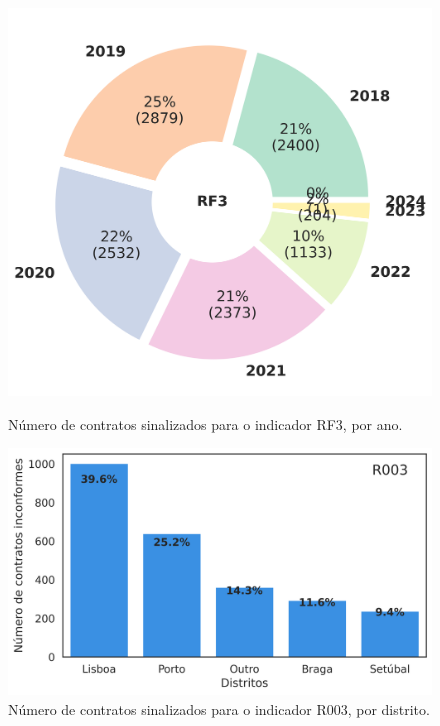 \begin{figure}[H]
	\centering
	\begin{minipage}{.44\linewidth}
		\includegraphics[width=\linewidth]{imagens/final/circle_RF3.png}
		\caption{Número de contratos sinalizados para o indicador RF3, por ano.}
		\label{final6}
		
	\end{minipage}
	\hfill
	\begin{minipage}{.44\linewidth}
		\includegraphics[width=\linewidth]{imagens/final/bar_R003.png}
		\caption{Número de contratos sinalizados para o indicador R003, por distrito.}
		\label{final7}
		
	\end{minipage}
\end{figure}


